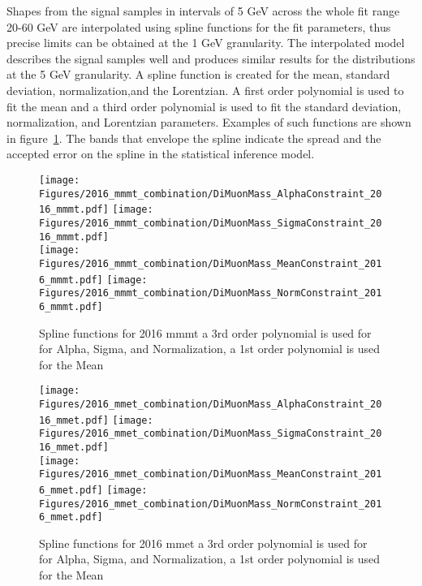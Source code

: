 Shapes from the signal samples in intervals of 5 GeV across the whole fit range 20-60 GeV are interpolated using spline functions for the fit parameters, thus precise limits can be obtained at the 1 GeV granularity. 
The interpolated model describes the signal samples well and produces similar results for the distributions at the 5 GeV granularity.  
A spline function is created for the mean, standard deviation, normalization,and the Lorentzian. 
A first order polynomial is used to fit the mean and a third order polynomial is used to fit the standard deviation, normalization, and Lorentzian parameters. 
Examples of such functions are shown in figure~\ref{fig:spline_2016_mmmt}. The bands that envelope the spline indicate the spread and the accepted error on the spline in the statistical inference model.
\begin{figure}[ht!b]
    \centering 
    \texttt{[image: Figures/2016\_mmmt\_combination/DiMuonMass\_AlphaConstraint\_2016\_mmmt.pdf]}
    \texttt{[image: Figures/2016\_mmmt\_combination/DiMuonMass\_SigmaConstraint\_2016\_mmmt.pdf]}\\
    \texttt{[image: Figures/2016\_mmmt\_combination/DiMuonMass\_MeanConstraint\_2016\_mmmt.pdf]}
    \texttt{[image: Figures/2016\_mmmt\_combination/DiMuonMass\_NormConstraint\_2016\_mmmt.pdf]}\\
    \caption{\label{fig:spline_2016_mmmt} Spline functions for 2016 mmmt a 3rd order polynomial is used for  for Alpha, Sigma, and Normalization, a 1st order polynomial is used for the Mean}
\end{figure}
\begin{figure}[ht!b]
    \centering 
    \texttt{[image: Figures/2016\_mmet\_combination/DiMuonMass\_AlphaConstraint\_2016\_mmet.pdf]}
    \texttt{[image: Figures/2016\_mmet\_combination/DiMuonMass\_SigmaConstraint\_2016\_mmet.pdf]}\\
    \texttt{[image: Figures/2016\_mmet\_combination/DiMuonMass\_MeanConstraint\_2016\_mmet.pdf]}
    \texttt{[image: Figures/2016\_mmet\_combination/DiMuonMass\_NormConstraint\_2016\_mmet.pdf]}\\
    \caption{\label{fig:spline_2016_mmet} Spline functions for 2016 mmet a 3rd order polynomial is used for  for Alpha, Sigma, and Normalization, a 1st order polynomial is used for the Mean}
\end{figure}
